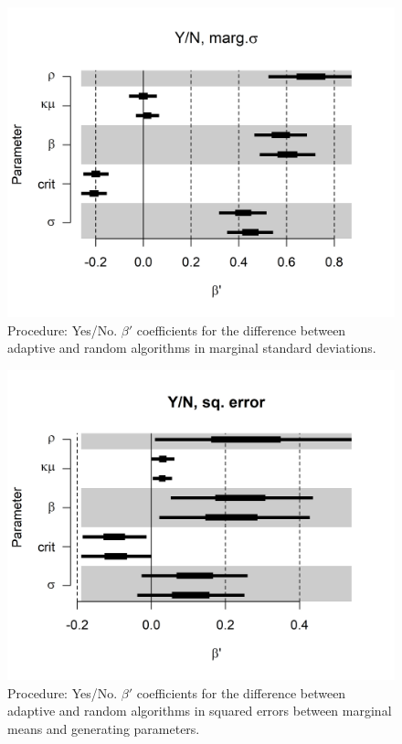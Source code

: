 \documentclass{article}\usepackage{knitr}
\begin{document}
\begin{figure}[H]
\centering
\includegraphics[scale=0.75]{qs_YN_SD}
\caption{Procedure: Yes/No. $\beta'$ coefficients for the difference between adaptive and random algorithms in marginal standard deviations.}
\label{fig:qs_YN_SD}
\end{figure} 

\begin{figure}[H]
\centering
\includegraphics[scale=0.75]{qs_YN_sq_error}
\caption{Procedure: Yes/No. $\beta'$ coefficients for the difference between adaptive and random algorithms in squared errors between marginal means and generating parameters.}
\label{fig:qs_YN_sq_error}
\end{figure} 
\end{document}
